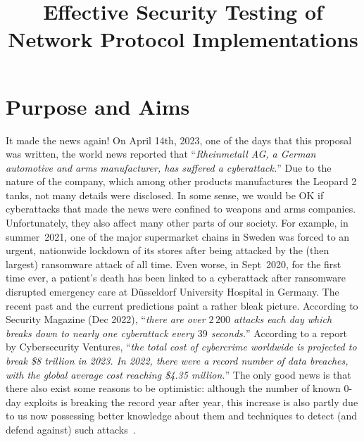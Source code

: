 \documentclass[11pt]{article}
\begin{document}
\title{\bf Effective Security Testing of Network Protocol Implementations}
\author{}
\date{}

\maketitle
\thispagestyle{plain}


\vspace*{-1.75em}

\section{Purpose and Aims} \label{sec:aims}
It made the news again! On April 14th, 2023, one of the days that this
proposal was written, the world news reported that ``\textit{Rheinmetall
  AG, a German automotive and arms manufacturer, has suffered a
  cyberattack.}'' Due to the nature of the company, which among other products
manufactures the Leopard 2 tanks, not many details were disclosed. In
some sense, we would be OK if cyberattacks that made the news were confined to
weapons and arms companies. Unfortunately, they also affect many other parts
of our society. For example, in summer~2021, one of the major supermarket
chains in Sweden was forced to an urgent, nationwide lockdown of its stores
after being attacked by the (then largest) ransomware attack of all time. Even
worse, in Sept~2020, for the first time ever, a patient’s death has been
linked to a cyberattack after ransomware disrupted emergency care at
Düsseldorf University Hospital in Germany.
%
The recent past and the current predictions paint a rather bleak picture.
According to Security Magazine (Dec 2022), ``\textit{there are over $2\,200$
attacks each day which breaks down to nearly one cyberattack every $39$ seconds.}''
%
According to a report by Cybersecurity Ventures, ``\textit{the total cost of
  cybercrime worldwide is projected to break \$8 trillion in 2023.
  In 2022, there were a record number of data breaches, with the
  global \emph{average} cost reaching \$4.35 million.}''
%
The only good news is that there also exist some reasons to be optimistic:
although the number of known 0-day exploits is breaking the record year after
year, this increase is also partly due to us now possessing better knowledge
about them and techniques to detect (and defend against) such
attacks~\cite{ONeil@MIT-TR-21}.
\end{document}
